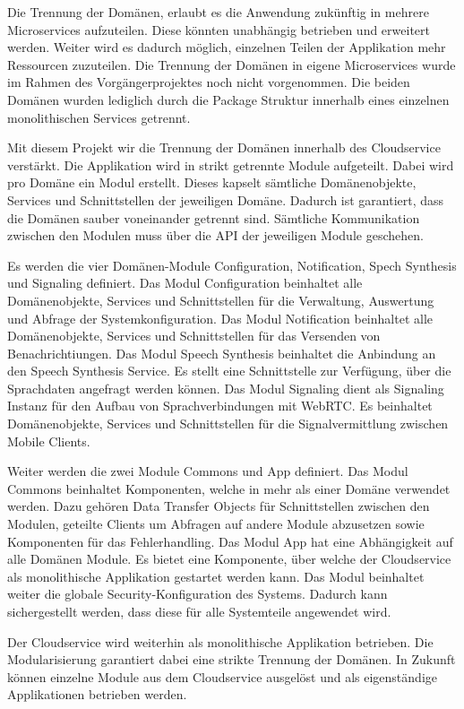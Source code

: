 Die Trennung der Domänen, erlaubt es die Anwendung zukünftig in mehrere Microservices aufzuteilen.
Diese könnten unabhängig betrieben und erweitert werden.
Weiter wird es dadurch möglich, einzelnen Teilen der Applikation mehr Ressourcen zuzuteilen.
Die Trennung der Domänen in eigene Microservices wurde im Rahmen des Vorgängerprojektes noch nicht vorgenommen.
Die beiden Domänen wurden lediglich durch die Package Struktur innerhalb eines einzelnen monolithischen Services getrennt.

Mit diesem Projekt wir die Trennung der Domänen innerhalb des Cloudservice verstärkt.
Die Applikation wird in strikt getrennte Module aufgeteilt.
Dabei wird pro Domäne ein Modul erstellt.
Dieses kapselt sämtliche Domänenobjekte, Services und Schnittstellen der jeweiligen Domäne.
Dadurch ist garantiert, dass die Domänen sauber voneinander getrennt sind.
Sämtliche Kommunikation zwischen den Modulen muss über die API der jeweiligen Module geschehen.

Es werden die vier Domänen-Module Configuration, Notification, Spech Synthesis und Signaling definiert.
Das Modul Configuration beinhaltet alle Domänenobjekte, Services und Schnittstellen für die Verwaltung, Auswertung und Abfrage der Systemkonfiguration.
Das Modul Notification beinhaltet alle Domänenobjekte, Services und Schnittstellen für das Versenden von Benachrichtiungen.
Das Modul Speech Synthesis beinhaltet die Anbindung an den Speech Synthesis Service.
Es stellt eine Schnittstelle zur Verfügung, über die Sprachdaten angefragt werden können.
Das Modul Signaling dient als Signaling Instanz für den Aufbau von Sprachverbindungen mit WebRTC\@.
Es beinhaltet Domänenobjekte, Services und Schnittstellen für die Signalvermittlung zwischen Mobile Clients.

Weiter werden die zwei Module Commons und App definiert.
Das Modul Commons beinhaltet Komponenten, welche in mehr als einer Domäne verwendet werden.
Dazu gehören Data Transfer Objects für Schnittstellen zwischen den Modulen, geteilte Clients um Abfragen auf andere Module abzusetzen sowie Komponenten für das Fehlerhandling.
Das Modul App hat eine Abhängigkeit auf alle Domänen Module.
Es bietet eine Komponente, über welche der Cloudservice als monolithische Applikation gestartet werden kann.
Das Modul beinhaltet weiter die globale Security-Konfiguration des Systems.
Dadurch kann sichergestellt werden, dass diese für alle Systemteile angewendet wird.

Der Cloudservice wird weiterhin als monolithische Applikation betrieben.
Die Modularisierung garantiert dabei eine strikte Trennung der Domänen.
In Zukunft können einzelne Module aus dem Cloudservice ausgelöst und als eigenständige Applikationen betrieben werden.


